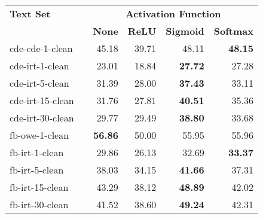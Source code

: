\begin{tabular}{ l c r r r r }
    \toprule

    \multicolumn{1}{l}{\textbf{Text Set}} & \phantom &
    \multicolumn{4}{c}{\textbf{Activation Function}} \\

    \cmidrule{3-6}

    &&
    \multicolumn{1}{c}{\textbf{None}} &
    \multicolumn{1}{c}{\textbf{ReLU}} &
    \multicolumn{1}{c}{\textbf{Sigmoid}} &
    \multicolumn{1}{c}{\textbf{Softmax}} \\

    \midrule

    cde-cde-1-clean  && 45.18 & 39.71 & 48.11 & \textbf{48.15} \\
    cde-irt-1-clean  && 23.01 & 18.84 & \textbf{27.72} & 27.28 \\
    cde-irt-5-clean  && 31.39 & 28.00 & \textbf{37.43} & 33.11 \\
    cde-irt-15-clean && 31.76 & 27.81 & \textbf{40.51} & 35.36 \\
    cde-irt-30-clean && 29.77 & 29.49 & \textbf{38.80} & 33.68 \\

    \addlinespace

    fb-owe-1-clean   && \textbf{56.86} & 50.00 & 55.95 & 55.96 \\
    fb-irt-1-clean   && 29.86 & 26.13 & 32.69 & \textbf{33.37} \\
    fb-irt-5-clean   && 38.03 & 34.15 & \textbf{41.66} & 37.31 \\
    fb-irt-15-clean  && 43.29 & 38.12 & \textbf{48.89} & 42.02 \\
    fb-irt-30-clean  && 41.52 & 38.60 & \textbf{49.24} & 42.31 \\

    \bottomrule
\end{tabular}
